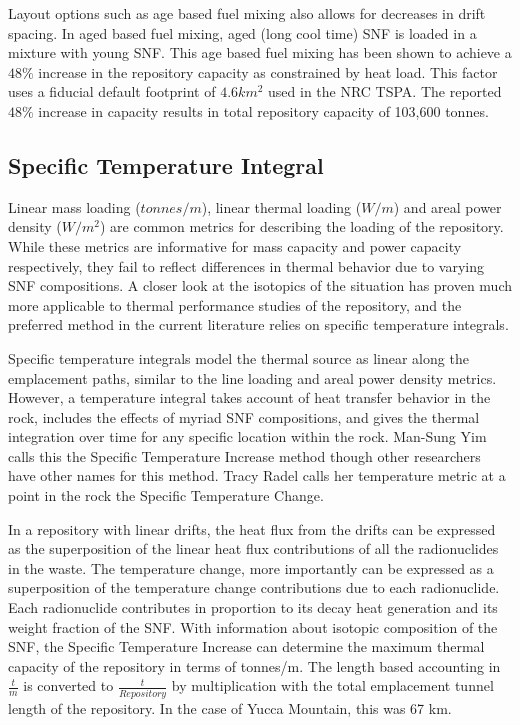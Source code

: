Layout options such as age based fuel mixing also allows for decreases in drift 
spacing. In aged based fuel mixing, aged (long cool time) SNF is loaded in a 
mixture with young SNF. This age based fuel mixing has been shown to achieve a 
$48\%$ increase in the repository capacity as constrained by heat
load\cite{nicholson_thermal_2007}. This factor uses a fiducial default
footprint of $4.6 km^2$ used in the NRC TSPA.  The reported $48\%$ increase in
capacity results in total repository capacity of 103,600
tonnes\cite{williams_total_2001}.


\subsection{Specific Temperature Integral}

Linear mass loading ($tonnes/m$), linear thermal loading ($W/m$) and areal power 
density ($W/m^2$) are common metrics
for describing the loading of the repository. While these metrics are
informative for mass capacity and power capacity respectively, they fail to
reflect differences in thermal behavior due to varying SNF compositions.  A
closer look at the isotopics of the situation has proven much more applicable
to thermal performance studies of the repository, and the preferred method in
the current literature relies on specific temperature integrals.


Specific temperature integrals model the thermal source as linear along the
emplacement paths, similar to the line loading and areal power density metrics.
However, a temperature integral takes account of heat transfer behavior in the
rock, includes the effects of myriad SNF compositions, and gives the thermal
integration over time for any specific location within the rock.  Man-Sung Yim
calls this the Specific Temperature Increase method\cite{li_specific_2008}
though other researchers have other names for this method. Tracy Radel calls
her temperature metric at a point in the rock the Specific Temperature
Change\cite{radel_repository_2007}.

In a repository with linear drifts, the heat flux from the drifts can be
expressed as the superposition of the linear heat flux contributions of all the
radionuclides in the waste. The temperature change, more importantly can be 
expressed as a superposition of the temperature change contributions due to  
each radionuclide. Each radionuclide contributes in proportion to its
decay heat generation and its weight fraction of the SNF. With information
about isotopic composition of the SNF, the Specific Temperature Increase can
determine the maximum thermal capacity of the repository in terms of tonnes/m.
The length based accounting in $\frac{t}{m}$ is converted to
$\frac{t}{Repository}$ by multiplication with the total emplacement tunnel
length of the repository.  In the case of Yucca Mountain, this was 67 km.

